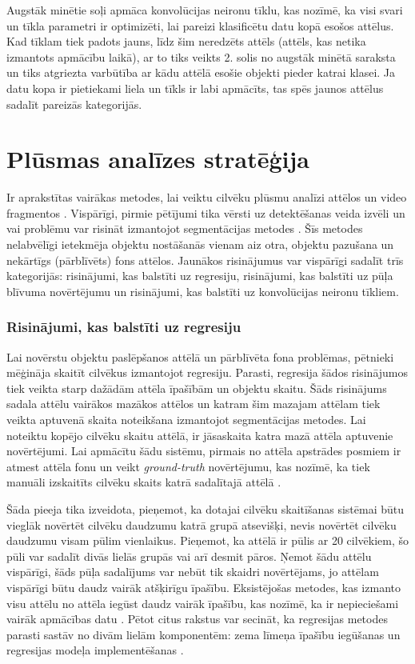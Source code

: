 Augstāk minētie soļi apmāca konvolūcijas neironu tīklu, kas nozīmē, ka visi svari un tīkla parametri ir optimizēti, lai pareizi klasificētu datu kopā esošos attēlus. Kad tīklam tiek padots jauns, līdz šim neredzēts attēls (attēls, kas netika izmantots apmācību laikā), ar to tiks veikts 2. solis no augstāk minētā saraksta un tiks atgriezta varbūtība ar kādu attēlā esošie objekti pieder katrai klasei. Ja datu kopa ir pietiekami liela un tīkls ir labi apmācīts, tas spēs jaunos attēlus sadalīt pareizās kategorijās. 

\section{Plūsmas analīzes stratēģija}
Ir aprakstītas vairākas metodes, lai veiktu cilvēku plūsmu analīzi attēlos un video fragmentos \cite{brostow2006unsupervised,chen2013cumulative,ge2009marked,chen2015person,lempitsky2010learning}. Vispārīgi, pirmie pētījumi tika vērsti uz detektēšanas veida izvēli un vai problēmu var risināt izmantojot segmentācijas metodes \cite{tu2008unified}. Šīs metodes nelabvēlīgi ietekmēja objektu nostāšanās vienam aiz otra, objektu pazušana un nekārtīgs (pārblīvēts) fons attēlos. Jaunākos risinājumus var vispārīgi sadalīt trīs kategorijās: risinājumi, kas balstīti uz regresiju, risinājumi, kas balstīti uz pūļa blīvuma novērtējumu un risinājumi, kas balstīti uz konvolūcijas neironu tīkliem. 

\subsubsection{Risinājumi, kas balstīti uz regresiju}
Lai novērstu objektu paslēpšanos attēlā un pārblīvēta fona problēmas, pētnieki mēģināja skaitīt cilvēkus izmantojot regresiju. Parasti, regresija šādos risinājumos tiek veikta starp dažādām attēla īpašībām un objektu skaitu. Šāds risinājums sadala attēlu vairākos mazākos attēlos un katram šim mazajam attēlam tiek veikta aptuvenā skaita noteikšana izmantojot segmentācijas metodes. Lai noteiktu kopējo cilvēku skaitu attēlā, ir jāsaskaita katra mazā attēla aptuvenie novērtējumi. Lai apmācītu šādu sistēmu, pirmais no attēla apstrādes posmiem ir atmest attēla fonu un veikt \textit{ground-truth} novērtējumu, kas nozīmē, ka tiek manuāli izskaitīts cilvēku skaits katrā sadalītajā attēlā  \cite{chan2009bayesian,ryan2009crowd,chen2012feature}.

Šāda pieeja tika izveidota, pieņemot, ka dotajai cilvēku skaitīšanas sistēmai būtu vieglāk novērtēt cilvēku daudzumu katrā grupā atsevišķi, nevis novērtēt cilvēku daudzumu visam pūlim vienlaikus. Pieņemot, ka attēlā ir pūlis ar 20 cilvēkiem, šo pūli var sadalīt divās lielās grupās vai arī desmit pāros. Ņemot šādu attēlu vispārīgi, šāds pūļa sadalījums var nebūt tik skaidri novērtējams, jo attēlam vispārīgi būtu daudz vairāk atšķirīgu īpašību. Eksistējošas metodes, kas izmanto visu attēlu no attēla iegūst daudz vairāk īpašību, kas nozīmē, ka ir nepieciešami vairāk apmācības datu \cite{chan2008privacy}. Pētot citus rakstus var secināt, ka regresijas metodes parasti sastāv no divām lielām komponentēm: zema līmeņa īpašību iegūšanas un regresijas modeļa implementēšanas \cite{xiong2017spatiotemporal}. 

